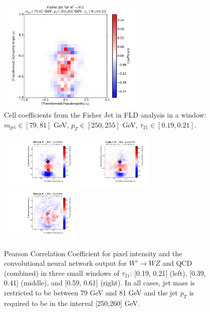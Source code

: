 \begin{figure}[h!]
  \centering
  \includegraphics[width=0.65\textwidth]{figures/fld-benwindow.pdf}
  \caption{Cell coefficients from the Fisher Jet in FLD analysis in a window: $m_\text{jet}\in [79, 81]$ GeV, $p_{T}\in [250, 255]$ GeV, $\tau_{21}\in[0.19, 0.21]$.}
  \label{fig:fldWindow}
\end{figure}

\begin{figure}[h!]
  \centering
  \includegraphics[width=0.33\textwidth]{figures/corr_map_20.pdf}  \includegraphics[width=0.33\textwidth]{figures/corr_map_40.pdf}  \includegraphics[width=0.33\textwidth]{figures/corr_map_60.pdf}
  \caption{Pearson Correlation Coefficient for pixel intensity and the convolutional neural network output for $W'\rightarrow WZ$ and QCD (combined) in three small windows of $\tau_{21}$: [0.19, 0.21] (left), [0.39, 0.41] (middle), and [0.59, 0.61] (right).  In all cases, jet mass is restricted to be between 79 GeV and 81 GeV and the jet $p_T$ is required to be in the interval [250,260] GeV.}
  \label{fig:corrWindow}
\end{figure}

